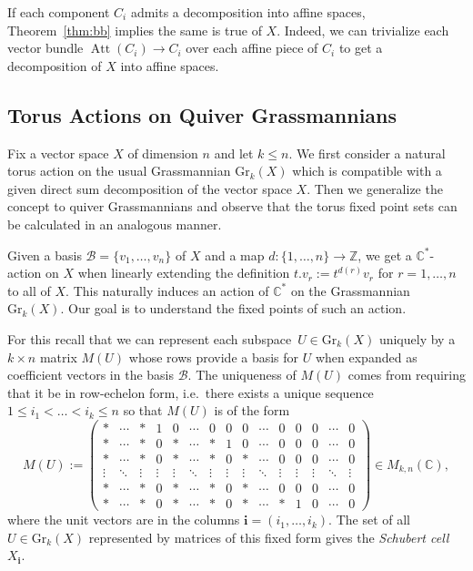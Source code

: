 \documentclass{amsart}
\numberwithin{equation}{section}
\newcommand{\bfi}{\mathbf{i}}
\newcommand{\C}{\mathbb{C}}
\newcommand{\Gr}{\mathrm{Gr}}
\newcommand{\CC}{\mathbb{C}}
\newcommand{\ZZ}{\mathbb{Z}}
\newcommand{\Att}{\operatorname{Att}}
\begin{document}
If each component $C_i$ admits a decomposition into affine spaces, Theorem~\ref{thm:bb} implies the same is true of $X$.
Indeed, we can trivialize each vector bundle $\Att(C_i)\to C_i$ over each affine piece of $C_i$ to get a decomposition of $X$ into affine spaces.


\subsection{Torus Actions on Quiver Grassmannians}
\label{torusaction}
Fix a vector space $X$ of dimension $n$ and let $k\leq n$.
We first consider a natural torus action on the usual Grassmannian $\Gr_k(X)$ which is compatible with a given direct sum decomposition of the vector space $X$.
Then we generalize the concept to quiver Grassmannians and observe that the torus fixed point sets can be calculated in an analogous manner.

Given a basis $\mathcal B=\{v_1,\ldots,v_n\}$ of $X$ and a map $d:\{1,\ldots,n\}\to\ZZ$, we get a $\C^\ast$-action on $X$ when linearly extending the definition $t.v_r:=t^{d(r)}v_r$ for $r=1,\ldots,n$ to all of $X$.
This naturally induces an action of $\C^\ast$ on the Grassmannian $\Gr_k(X)$.
Our goal is to understand the fixed points of such an action.

For this recall that we can represent each subspace~$U\in\Gr_k(X)$ uniquely by a $k\times n$ matrix $M(U)$ whose rows provide a basis for $U$ when expanded as coefficient vectors in the basis $\mathcal B$.
The uniqueness of $M(U)$ comes from requiring that it be in row-echelon form, i.e.\ there exists a unique sequence $1\leq i_1<\ldots<i_k\leq n$ so that $M(U)$ is of the form
\[M(U):=
  \begin{pmatrix}
    \ast&\cdots &\ast &1&0 &\cdots& 0 & 0 & 0 &\cdots&0&0&0&\cdots&0\\
    \ast&\cdots &\ast&0&\ast&\cdots &\ast&1&0&\cdots&0&0&0&\cdots&0\\
    \ast &\cdots&\ast&0&\ast &\cdots&\ast&0&\ast&\cdots&0&0&0&\cdots&0\\[-0.4em]
    \vdots &\ddots&\vdots&\vdots&\vdots &\ddots&\vdots&\vdots&\vdots&\ddots&\vdots&\vdots&\vdots&\ddots&\vdots\\
    \ast&\cdots &\ast&0&\ast&\cdots &\ast&0&\ast&\cdots&0&0&0&\cdots&0\\
    \ast&\cdots &\ast&0&\ast&\cdots &\ast&0&\ast&\cdots&\ast&1&0&\cdots&0
  \end{pmatrix}\in M_{k,n}(\CC),\]
where the unit vectors are in the columns $\bfi=(i_1,\ldots,i_k)$.
The set of all $U\in\Gr_k(X)$ represented by matrices of this fixed form gives the \emph{Schubert cell} $X_\bfi$.
\end{document}

